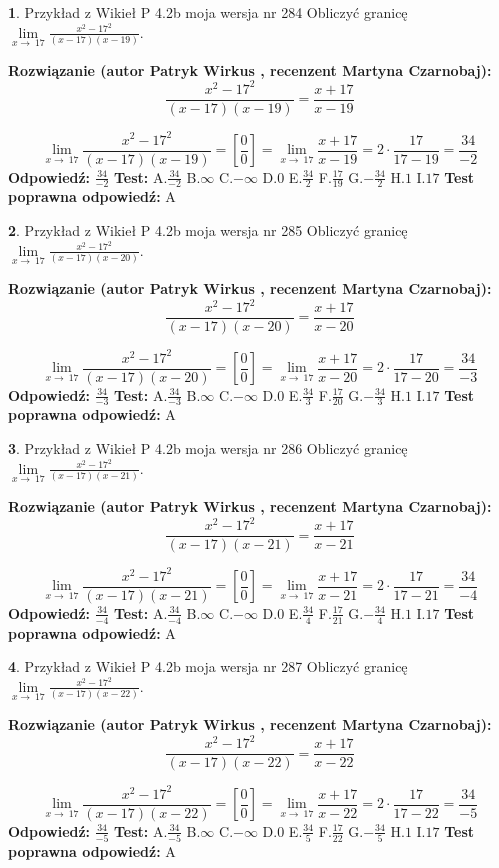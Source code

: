 \documentclass[12pt, a4paper]{article}
\theoremstyle{definition} %
\newtheorem{zad}{}
\newcommand{\zadStart}[1]{\begin{zad}#1\newline}
\newcommand{\zadStop}{\end{zad}}
\newcommand{\rozwStart}[2]{\noindent \textbf{Rozwiązanie (autor #1 , recenzent #2): }\newline}
\newcommand{\rozwStop}{\newline}
\newcommand{\odpStart}{\noindent \textbf{Odpowiedź:}\newline}
\newcommand{\odpStop}{\newline}
\newcommand{\testStart}{\noindent \textbf{Test:}\newline}
\newcommand{\testStop}{\newline}
\newcommand{\kluczStart}{\noindent \textbf{Test poprawna odpowiedź:}\newline}
\newcommand{\kluczStop}{\newline}
\begin{document}
\zadStart{Przykład z Wikieł P 4.2b moja wersja nr 284}
Obliczyć granicę $\lim\limits_{x\to\ 17}\frac{x^{2}-17^{2}}{(x-17)(x-19)}$.
\zadStop
\rozwStart{Patryk Wirkus}{Martyna Czarnobaj}
$$\frac{x^{2}-17^{2}}{(x-17)(x-19)}=\frac{x+17}{x-19}$$

$$\lim\limits_{x\to\ 17}\frac{x^{2}-17^{2}}{(x-17)(x-19)}=[\frac{0}{0}]=\lim\limits_{x\to\ 17}\frac{x+17}{x-19}=2 \cdot \frac{17}{17-19} = \frac{34}{-2}$$
\rozwStop
\odpStart
$\frac{34}{-2}$
\odpStop
\testStart
A.$\frac{34}{-2}$
B.$\infty$
C.$-\infty$
D.$0$
E.$\frac{34}{2}$
F.$\frac{17}{19}$
G.$-\frac{34}{2}$
H.$1$
I.$17$
\testStop
\kluczStart
A
\kluczStop



\zadStart{Przykład z Wikieł P 4.2b moja wersja nr 285}
Obliczyć granicę $\lim\limits_{x\to\ 17}\frac{x^{2}-17^{2}}{(x-17)(x-20)}$.
\zadStop
\rozwStart{Patryk Wirkus}{Martyna Czarnobaj}
$$\frac{x^{2}-17^{2}}{(x-17)(x-20)}=\frac{x+17}{x-20}$$

$$\lim\limits_{x\to\ 17}\frac{x^{2}-17^{2}}{(x-17)(x-20)}=[\frac{0}{0}]=\lim\limits_{x\to\ 17}\frac{x+17}{x-20}=2 \cdot \frac{17}{17-20} = \frac{34}{-3}$$
\rozwStop
\odpStart
$\frac{34}{-3}$
\odpStop
\testStart
A.$\frac{34}{-3}$
B.$\infty$
C.$-\infty$
D.$0$
E.$\frac{34}{3}$
F.$\frac{17}{20}$
G.$-\frac{34}{3}$
H.$1$
I.$17$
\testStop
\kluczStart
A
\kluczStop



\zadStart{Przykład z Wikieł P 4.2b moja wersja nr 286}
Obliczyć granicę $\lim\limits_{x\to\ 17}\frac{x^{2}-17^{2}}{(x-17)(x-21)}$.
\zadStop
\rozwStart{Patryk Wirkus}{Martyna Czarnobaj}
$$\frac{x^{2}-17^{2}}{(x-17)(x-21)}=\frac{x+17}{x-21}$$

$$\lim\limits_{x\to\ 17}\frac{x^{2}-17^{2}}{(x-17)(x-21)}=[\frac{0}{0}]=\lim\limits_{x\to\ 17}\frac{x+17}{x-21}=2 \cdot \frac{17}{17-21} = \frac{34}{-4}$$
\rozwStop
\odpStart
$\frac{34}{-4}$
\odpStop
\testStart
A.$\frac{34}{-4}$
B.$\infty$
C.$-\infty$
D.$0$
E.$\frac{34}{4}$
F.$\frac{17}{21}$
G.$-\frac{34}{4}$
H.$1$
I.$17$
\testStop
\kluczStart
A
\kluczStop



\zadStart{Przykład z Wikieł P 4.2b moja wersja nr 287}
Obliczyć granicę $\lim\limits_{x\to\ 17}\frac{x^{2}-17^{2}}{(x-17)(x-22)}$.
\zadStop
\rozwStart{Patryk Wirkus}{Martyna Czarnobaj}
$$\frac{x^{2}-17^{2}}{(x-17)(x-22)}=\frac{x+17}{x-22}$$

$$\lim\limits_{x\to\ 17}\frac{x^{2}-17^{2}}{(x-17)(x-22)}=[\frac{0}{0}]=\lim\limits_{x\to\ 17}\frac{x+17}{x-22}=2 \cdot \frac{17}{17-22} = \frac{34}{-5}$$
\rozwStop
\odpStart
$\frac{34}{-5}$
\odpStop
\testStart
A.$\frac{34}{-5}$
B.$\infty$
C.$-\infty$
D.$0$
E.$\frac{34}{5}$
F.$\frac{17}{22}$
G.$-\frac{34}{5}$
H.$1$
I.$17$
\testStop
\kluczStart
A
\kluczStop
\end{document}
